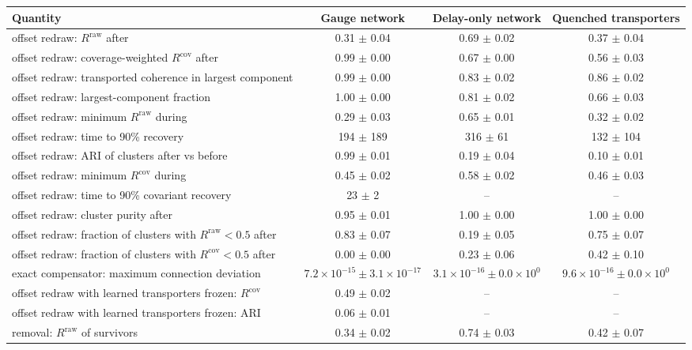 \begin{tabular}{@{}lccc@{}}
\toprule
Quantity & Gauge network & Delay-only network & Quenched transporters \\
\midrule
offset redraw: $R^{\mathrm{raw}}$ after & 0.31 $\pm$ 0.04 & 0.69 $\pm$ 0.02 & 0.37 $\pm$ 0.04 \\
offset redraw: coverage-weighted $R^{\mathrm{cov}}$ after & 0.99 $\pm$ 0.00 & 0.67 $\pm$ 0.00 & 0.56 $\pm$ 0.03 \\
offset redraw: transported coherence in largest component & 0.99 $\pm$ 0.00 & 0.83 $\pm$ 0.02 & 0.86 $\pm$ 0.02 \\
offset redraw: largest-component fraction & 1.00 $\pm$ 0.00 & 0.81 $\pm$ 0.02 & 0.66 $\pm$ 0.03 \\
offset redraw: minimum $R^{\mathrm{raw}}$ during & 0.29 $\pm$ 0.03 & 0.65 $\pm$ 0.01 & 0.32 $\pm$ 0.02 \\
offset redraw: time to 90\% recovery & 194 $\pm$ 189 & 316 $\pm$ 61 & 132 $\pm$ 104 \\
offset redraw: ARI of clusters after vs before & 0.99 $\pm$ 0.01 & 0.19 $\pm$ 0.04 & 0.10 $\pm$ 0.01 \\
offset redraw: minimum $R^{\mathrm{cov}}$ during & 0.45 $\pm$ 0.02 & 0.58 $\pm$ 0.02 & 0.46 $\pm$ 0.03 \\
offset redraw: time to 90\% covariant recovery & 23 $\pm$ 2 & -- & -- \\
offset redraw: cluster purity after & 0.95 $\pm$ 0.01 & 1.00 $\pm$ 0.00 & 1.00 $\pm$ 0.00 \\
offset redraw: fraction of clusters with $R^{\mathrm{raw}}<0.5$ after & 0.83 $\pm$ 0.07 & 0.19 $\pm$ 0.05 & 0.75 $\pm$ 0.07 \\
offset redraw: fraction of clusters with $R^{\mathrm{cov}}<0.5$ after & 0.00 $\pm$ 0.00 & 0.23 $\pm$ 0.06 & 0.42 $\pm$ 0.10 \\
exact compensator: maximum connection deviation & $7.2\times 10^{-15} \pm 3.1\times 10^{-17}$ & $3.1\times 10^{-16} \pm 0.0\times 10^{0}$ & $9.6\times 10^{-16} \pm 0.0\times 10^{0}$ \\
offset redraw with learned transporters frozen: $R^{\mathrm{cov}}$ & 0.49 $\pm$ 0.02 & -- & -- \\
offset redraw with learned transporters frozen: ARI & 0.06 $\pm$ 0.01 & -- & -- \\
removal: $R^{\mathrm{raw}}$ of survivors & 0.34 $\pm$ 0.02 & 0.74 $\pm$ 0.03 & 0.42 $\pm$ 0.07 \\

\end{tabular}
